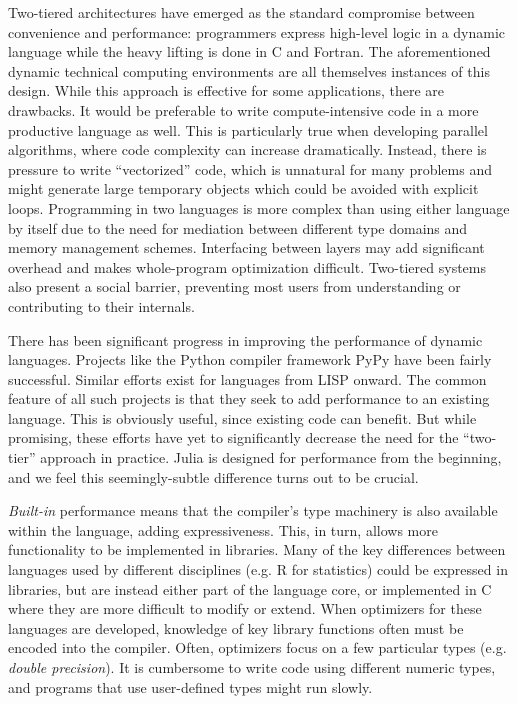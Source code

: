\documentclass[9pt]{sigplanconf}
\begin{document}
Two-tiered architectures have emerged as the standard compromise between
convenience and performance: programmers express high-level logic in a
dynamic language while the heavy lifting is done in C and Fortran. The
aforementioned dynamic technical computing environments are all themselves
instances of this design. While this approach is effective for some
applications, there are drawbacks. It would be preferable to write
compute-intensive code in a more productive language as well. This is
particularly true when developing parallel algorithms, where code
complexity can increase dramatically. Instead, there is pressure to write
``vectorized'' code, which is unnatural for many problems and might
generate large temporary objects which could be avoided with explicit
loops. Programming in two languages is more complex than using either
language by itself due to the need for mediation between different type
domains and memory management schemes. Interfacing between layers may add
significant overhead and makes whole-program optimization difficult.
Two-tiered systems also present a social barrier, preventing most users
from understanding or contributing to their internals.

There has been significant progress in improving the performance of
dynamic languages. Projects like the Python compiler framework PyPy
\cite{pypyjit} have been fairly successful. Similar efforts exist for
languages from LISP onward. The common feature of all such projects is
that they seek to add performance to an existing language. This is
obviously useful, since existing code can benefit. But while promising,
these efforts have yet to significantly decrease the need for the
``two-tier'' approach in practice. Julia is designed for performance from
the beginning, and we feel this seemingly-subtle difference turns out to
be crucial.


{\it Built-in} performance means that the compiler's type machinery is
also available within the language, adding expressiveness. This, in turn,
allows more functionality to be implemented in libraries. Many of the key
differences between languages used by different disciplines (e.g. R for
statistics) could be expressed in libraries, but are instead either part
of the language core, or implemented in C where they are more difficult to
modify or extend. When optimizers for these languages are developed,
knowledge of key library functions often must be encoded into the
compiler. Often, optimizers focus on a few particular types (e.g. {\it
double precision}). It is cumbersome to write code using different numeric
types, and programs that use user-defined types might run slowly.
\end{document}
